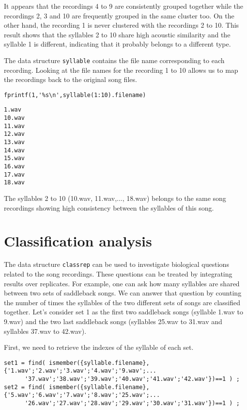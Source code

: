 \documentclass[a4paper]{article}
\begin{document}
It appears that the recordings 4 to 9 are consistently grouped together while the recordings 2, 3 and 10 are frequently grouped in the same cluster too.
On the other hand, the recording 1 is never clustered with the recordings 2 to 10.
This result shows that the syllables 2 to 10 share high acoustic similarity and the syllable 1 is different, indicating that it probably belongs to a different type. 

The data structure \texttt{syllable} contains the file name corresponding to each recording.
Looking at the file names for the recording 1 to 10 allows us to map the recordings back to the original song files.

\begin{verbatim}
fprintf(1,'%s\n',syllable(1:10).filename)
\end{verbatim}

\color{lightgray}
\begin{verbatim}
1.wav
10.wav
11.wav
12.wav
13.wav
14.wav
15.wav
16.wav
17.wav
18.wav
\end{verbatim}
\color{black}

The syllables 2 to 10 (10.wav, 11.wav,..., 18.wav) belongs to the same song recordings showing high consistency between the syllables of this song.

\section{Classification analysis}
The data structure \texttt{classrep} can be used to investigate biological questions related to the song recordings.
These questions can be treated by integrating results over replicates.
For example, one can ask how many syllables are shared between two sets of saddleback songs.
We can answer that question by counting the number of times the syllables of the two different sets of songs are classified together.
Let's consider set 1 as the first two saddleback songs (syllable 1.wav to 9.wav) and the two last saddleback songs (syllables 25.wav to 31.wav and syllables 37.wav to 42.wav).

First, we need to retrieve the indexes of the syllable of each set.

\begin{verbatim}
set1 = find( ismember({syllable.filename},{'1.wav';'2.wav';'3.wav';'4.wav';'9.wav';...
      '37.wav';'38.wav';'39.wav';'40.wav';'41.wav';'42.wav'})==1 ) ;
set2 = find( ismember({syllable.filename},{'5.wav';'6.wav';'7.wav';'8.wav';'25.wav';...
      '26.wav';'27.wav';'28.wav';'29.wav';'30.wav';'31.wav'})==1 ) ;
\end{verbatim}
\end{document}
